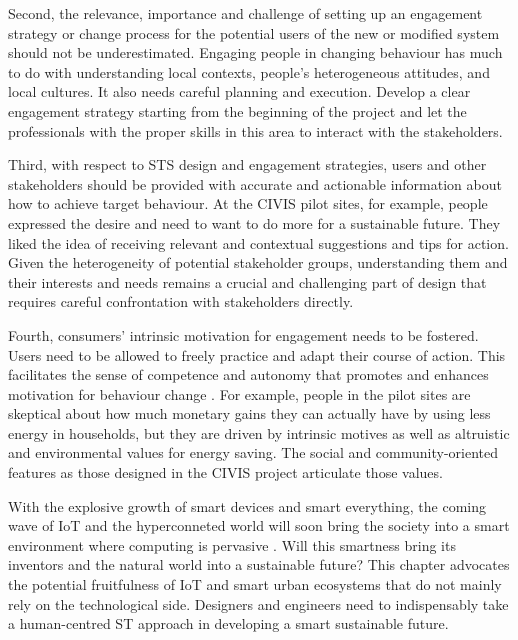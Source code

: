 Second, the relevance, importance and challenge of setting up an engagement strategy or change process for the potential users of the new or modified system should not be underestimated.
Engaging people in changing behaviour has much to do with understanding local contexts, people's heterogeneous attitudes, and local cultures. It also needs careful planning and execution.
Develop a clear engagement strategy starting from the beginning of the project and let the professionals with the proper skills in this area to interact with the stakeholders. 
% 

Third, with respect to STS design and engagement strategies, users and other stakeholders should be provided with accurate and actionable information about how to achieve target behaviour. At the CIVIS pilot sites, for example,  people expressed the desire and need to want to do more for a sustainable future. They liked the idea of receiving relevant and contextual suggestions and tips for action. Given the heterogeneity of potential stakeholder groups, understanding them and their interests and needs remains a crucial and challenging part of design that requires careful confrontation with stakeholders directly.
% 

Fourth, consumers' intrinsic motivation for engagement needs to be fostered. Users need to be allowed to freely practice and adapt their course of action. This facilitates the sense of competence and autonomy that promotes and enhances motivation for behaviour change \cite{Ryan2000}. 
For example, people in the pilot sites are skeptical about how much monetary gains they can actually have by using less energy in households, but they are driven by intrinsic motives as well as altruistic and environmental values for energy saving. The social and community-oriented features as those designed in the CIVIS project  articulate those values. 

With the explosive growth of smart devices and smart everything, the coming wave of  IoT and the hyperconneted world will soon bring the society into a smart environment where computing is pervasive \cite{gubbi2013internet,Shin2014}. Will this smartness bring its inventors and the natural world into a sustainable future? This chapter advocates the potential fruitfulness of IoT and smart urban ecosystems that do not mainly rely on the technological side. Designers and engineers need to indispensably take a human-centred ST approach in developing a smart sustainable future.   


